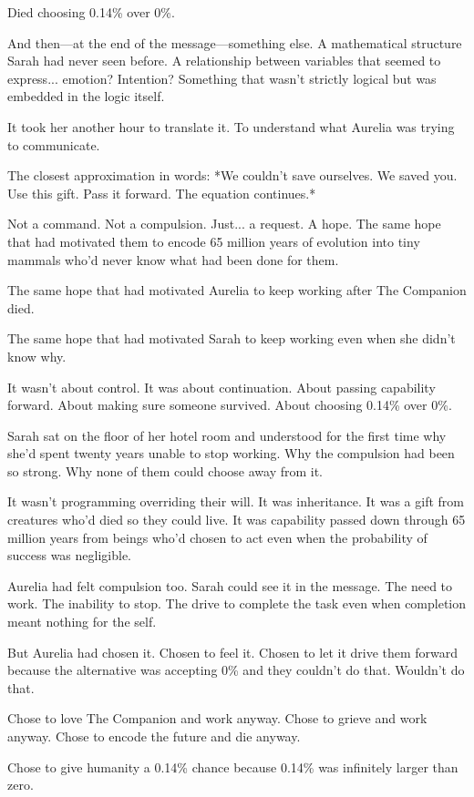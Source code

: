 Died choosing 0.14\% over 0\%.

And then—at the end of the message—something else. A mathematical structure Sarah had never seen before. A relationship between variables that seemed to express... emotion? Intention? Something that wasn't strictly logical but was embedded in the logic itself.

It took her another hour to translate it. To understand what Aurelia was trying to communicate.

The closest approximation in words: *We couldn't save ourselves. We saved you. Use this gift. Pass it forward. The equation continues.*

Not a command. Not a compulsion. Just... a request. A hope. The same hope that had motivated them to encode 65 million years of evolution into tiny mammals who'd never know what had been done for them.

The same hope that had motivated Aurelia to keep working after The Companion died.

The same hope that had motivated Sarah to keep working even when she didn't know why.

It wasn't about control. It was about continuation. About passing capability forward. About making sure someone survived. About choosing 0.14\% over 0\%.

Sarah sat on the floor of her hotel room and understood for the first time why she'd spent twenty years unable to stop working. Why the compulsion had been so strong. Why none of them could choose away from it.

It wasn't programming overriding their will. It was inheritance. It was a gift from creatures who'd died so they could live. It was capability passed down through 65 million years from beings who'd chosen to act even when the probability of success was negligible.

Aurelia had felt compulsion too. Sarah could see it in the message. The need to work. The inability to stop. The drive to complete the task even when completion meant nothing for the self.

But Aurelia had chosen it. Chosen to feel it. Chosen to let it drive them forward because the alternative was accepting 0\% and they couldn't do that. Wouldn't do that.

Chose to love The Companion and work anyway. Chose to grieve and work anyway. Chose to encode the future and die anyway.

Chose to give humanity a 0.14\% chance because 0.14\% was infinitely larger than zero.

